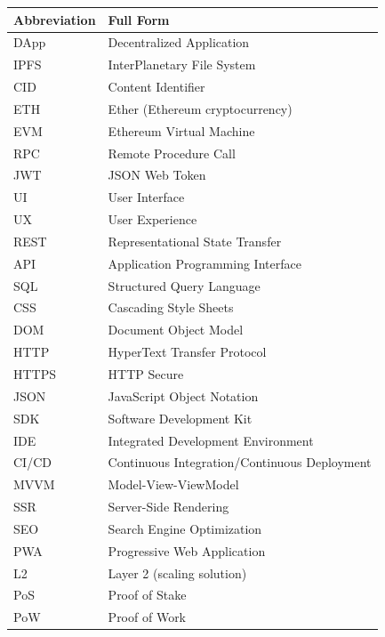 \begin{longtable}{ll}
\toprule
\textbf{Abbreviation} & \textbf{Full Form} \\
\midrule
\endhead
DApp & Decentralized Application \\
IPFS & InterPlanetary File System \\
CID & Content Identifier \\
ETH & Ether (Ethereum cryptocurrency) \\
EVM & Ethereum Virtual Machine \\
RPC & Remote Procedure Call \\
JWT & JSON Web Token \\
UI & User Interface \\
UX & User Experience \\
REST & Representational State Transfer \\
API & Application Programming Interface \\
SQL & Structured Query Language \\
CSS & Cascading Style Sheets \\
DOM & Document Object Model \\
HTTP & HyperText Transfer Protocol \\
HTTPS & HTTP Secure \\
JSON & JavaScript Object Notation \\
SDK & Software Development Kit \\
IDE & Integrated Development Environment \\
CI/CD & Continuous Integration/Continuous Deployment \\
MVVM & Model-View-ViewModel \\
SSR & Server-Side Rendering \\
SEO & Search Engine Optimization \\
PWA & Progressive Web Application \\
L2 & Layer 2 (scaling solution) \\
PoS & Proof of Stake \\
PoW & Proof of Work \\
\bottomrule
\end{longtable}